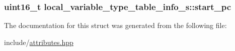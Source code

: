 \hypertarget{structlocal__variable__type__table__info__s_a3c7eafcb1edc9ef0fb4c2f9f48b51847}{
\subsubsection[{start\+\_\+pc}]{\setlength{\rightskip}{0pt plus 5cm}uint16\+\_\+t local\+\_\+variable\+\_\+type\+\_\+table\+\_\+info\+\_\+s\+::start\+\_\+pc}}\label{structlocal__variable__type__table__info__s_a3c7eafcb1edc9ef0fb4c2f9f48b51847}


The documentation for this struct was generated from the following file\+:\begin{DoxyCompactItemize}
\item 
include/\hyperlink{attributes_8hpp}{attributes.\+hpp}\end{DoxyCompactItemize}
